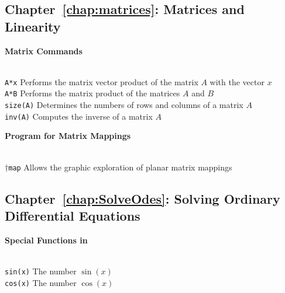 \documentclass{ximera}
\begin{document}
\subsection*{Chapter~\ref{chap:matrices}: Matrices and Linearity}



\centerline{
{\bf Matrix Commands}
} \vspace*{-0.1in}
 
\begin{tabbing}
 \hspace{1.1in} \= \\

     {\tt A*x}  \index{\computer!*} \>
 Performs the matrix vector product of the matrix $A$
                        with the vector $x$   \\
 
     {\tt A*B}  \index{\computer!*} \>
 Performs the matrix product of the matrices 
			$A$ and $B$   \\
 
     {\tt size(A)}   \>
 Determines the numbers of rows and columns of a matrix $A$   \\

     {\tt inv(A)}   \>
 Computes the inverse of a matrix $A$ 

\end{tabbing}

\centerline{
{\bf Program for Matrix Mappings}
} \vspace*{-0.1in}
 
 \begin{tabbing}
 \hspace{1.1in} \= \\

    $\dagger${\tt map}   \>
 Allows the graphic exploration of planar matrix mappings   

\end{tabbing}


\subsection*{Chapter~\ref{chap:SolveOdes}: Solving Ordinary Differential Equations}

\centerline{
{\bf Special Functions in \Matlab}
} \vspace*{-0.1in}

\begin{tabbing}
 \hspace{1.1in} \= \\

	{\tt sin(x)}   \>
 The number $\sin(x)$ \\

	{\tt cos(x)}  \>
 The number $\cos(x)$
\end{tabbing}
 
\end{document}
